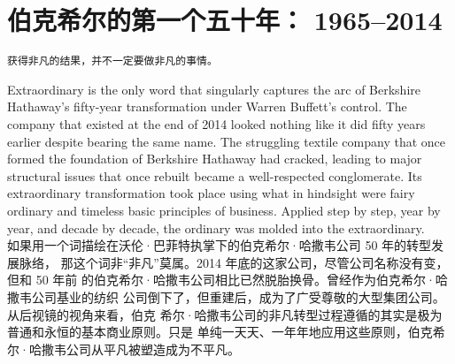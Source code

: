 \chapter{伯克希尔的第一个五十年： 1965--2014}

\texttt{获得非凡的结果，并不一定要做非凡的事情。}

\begin{verseparallel}
  {
    \noindent Extraordinary is the only word that singularly captures the arc of
    Berkshire Hathaway’s fifty-year transformation under Warren Buffett’s
    control. The company that existed at the end of 2014 looked nothing like it
    did fifty years earlier despite bearing the same name. The struggling
    textile company that once formed the foundation of Berkshire Hathaway had
    cracked, leading to major structural issues that once rebuilt became a
    well-respected conglomerate. Its extraordinary transformation took place
    using what in hindsight were fairy ordinary and timeless basic principles of
    business. Applied step by step, year by year, and decade by decade, the
    ordinary was molded into the extraordinary. \\
  }
  {
    如果用一个词描绘在沃伦·巴菲特执掌下的伯克希尔·哈撒韦公司 50 年的转型发展脉络，
    那这个词非“非凡”莫属。2014 年底的这家公司，尽管公司名称没有变，但和 50 年前
    的伯克希尔·哈撒韦公司相比已然脱胎换骨。曾经作为伯克希尔·哈撒韦公司基业的纺织
    公司倒下了，但重建后，成为了广受尊敬的大型集团公司。从后视镜的视角来看，伯克
    希尔·哈撒韦公司的非凡转型过程遵循的其实是极为普通和永恒的基本商业原则。只是
    单纯一天天、一年年地应用这些原则，伯克希尔·哈撒韦公司从平凡被塑造成为不平凡。
  }
\end{verseparallel}

